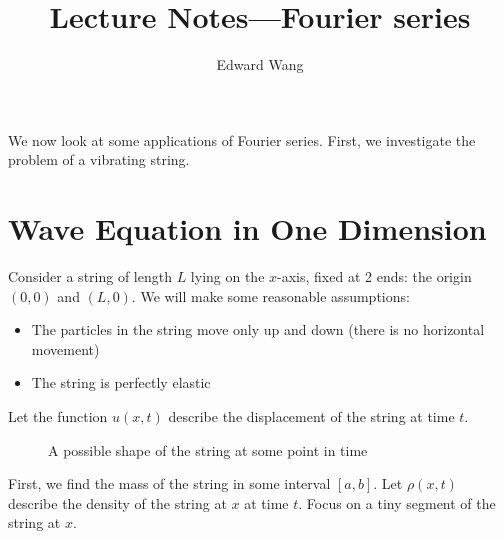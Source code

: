 \documentclass{amsart}
\title{Lecture Notes---Fourier series}
\author{Edward Wang}
\begin{document}
  \maketitle
  We now look at some applications of Fourier series. First, we investigate the problem of a vibrating string.

  \section{Wave Equation in One Dimension}

  Consider a string of length $L$ lying on the $x$-axis, fixed at 2 ends: the origin $(0, 0)$ and $(L, 0)$. We will make some reasonable assumptions:
  \begin{itemize}
    \item The particles in the string move only up and down (there is no horizontal movement)
    \item The string is perfectly elastic
  \end{itemize}Let the function $u(x, t)$ describe the displacement of the string at time $t$.
  \begin{figure}[H]
    \centering
    \caption{A possible shape of the string at some point in time}
  \end{figure}
  First, we find the mass of the string in some interval $[a, b]$. Let  $\rho(x, t)$ describe the density of the string at  $x$ at time $t$. Focus on a tiny segment of the string at $x$.
  \begin{figure}[H]
  \end{figure}
\end{document}
